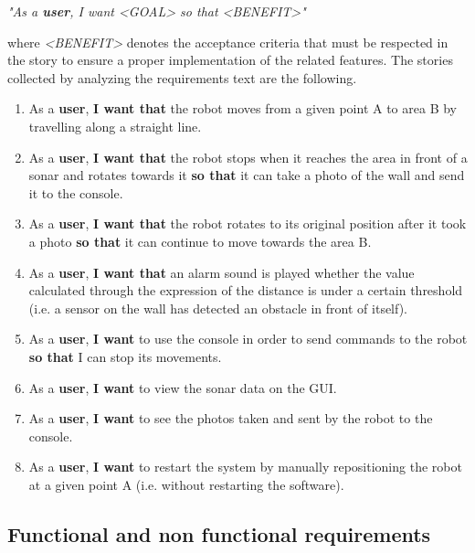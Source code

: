 \documentclass[a4paper]{article}
\begin{document}
\begin{center}
\textit{"As a \textbf{user}, I want <GOAL> so that <BENEFIT>"}
\end{center}

where \textit{<BENEFIT>} denotes the acceptance criteria that must be respected in the story to ensure a proper implementation of the related features. \newline\newline
The stories collected by analyzing the requirements text are the following.

\begin{enumerate}
	\item As a \textbf{user}, \textbf{I want that} the robot moves from a given point A to area B by travelling along a straight line.
	\item As a \textbf{user}, \textbf{I want that} the robot stops when it reaches the area in front of a sonar and rotates towards it \textbf{so that} it can take a photo of the wall and send it to the console.
	\item As a \textbf{user}, \textbf{I want that} the robot rotates to its original position after it took a photo \textbf{so that} it can continue to move towards the area B.
	\item As a \textbf{user}, \textbf{I want that} an alarm sound is played whether the value calculated through the expression of the distance is under a certain threshold (i.e. a sensor on the wall has detected an obstacle in front of itself).
	\item As a \textbf{user}, \textbf{I want} to use the console in order to send commands to the robot \textbf{so that} I can stop its movements.
	\item As a \textbf{user}, \textbf{I want} to view the sonar data on the GUI.
	\item As a \textbf{user}, \textbf{I want} to see the photos taken and sent by the robot to the console.
	\item As a \textbf{user}, \textbf{I want} to restart the system by manually repositioning the robot at a given point A (i.e. without restarting the software).
\end{enumerate}

\subsection {Functional and non functional requirements}
\end{document}
